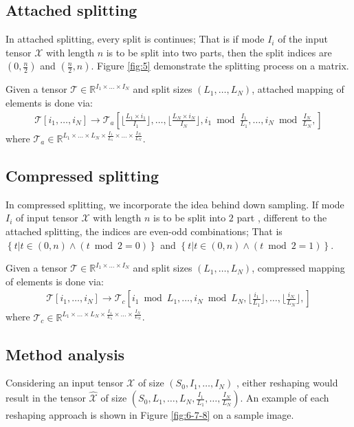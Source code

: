 \documentclass{article}
\begin{document}
\subsection{Attached splitting}
\label{subsec:attached-approach}

In attached splitting, every split is continues; That is if mode  $I_i$ of the input tensor $\mathcal{X}$ with length $n$ is to be split into two parts, then the split indices are $(0,\frac{n}{2})$ and $(\frac{n}{2}, n)$.
Figure 
\ref{fig:5} 
demonstrate the splitting process on a matrix. 

Given a tensor $\mathcal{T} \in \mathbb{R}^{I_1\times\dots\times I_N}$ and split sizes 
$\left(L_1,\dots,L_N\right)$, attached mapping of elements is done via:
\begin{align}
	\label{eq:map1}
	\mathcal{T}\left[i_1,\dots,i_N\right] \longrightarrow
	\mathcal{T}_a\left[
	\lfloor\frac{L_1\times i_1}{I_1}\rfloor,
	\dots,
	\lfloor\frac{L_N\times i_N}{I_N}\rfloor,
	i_1 \bmod{\frac{I_1}{L_1}},
	\dots,
	i_N \bmod{\frac{I_N}{L_N}},
	\right]
\end{align}
where $\mathcal{T}_a \in \mathbb{R}^{L_1\times\dots\times L_N\times \frac{I_1}{L_1}\times\dots\times \frac{I_N}{L_N}}$.
\subsection{Compressed splitting}
\label{subsec:copressed-splitting}

In compressed splitting, we incorporate the idea behind down sampling. If mode $I_i$ of input tensor $\mathcal{X}$ with length $n$ is to be split into $2$ part , different to the attached splitting, the indices are even-odd combinations; That is $\left\{
t | t \in (0,n) \land 
\left(t\bmod{2} = 0\right)
\right\}$
and 
$\left\{
t | t \in (0,n) \land 
\left(t\bmod{2} = 1\right)
\right\}$.

Given a tensor $\mathcal{T} \in \mathbb{R}^{I_1\times\dots\times I_N}$ and split sizes 
$\left(L_1,\dots,L_N\right)$, compressed mapping of elements is done via:
\begin{align}
	\label{eq:map2}
	\mathcal{T}\left[i_1,\dots,i_N\right] \longrightarrow
	\mathcal{T}_c\left[
	i_1 \bmod{L_1},
	\dots,
	i_N \bmod{L_N},
	\lfloor\frac{i_1}{L_1}\rfloor,
	\dots,
	\lfloor\frac{i_N}{L_N}\rfloor,
	\right]
\end{align}
where $\mathcal{T}_c \in \mathbb{R}^{L_1\times\dots\times L_N\times \frac{I_1}{L_1}\times\dots\times \frac{I_N}{L_N}}$.
\subsection{Method analysis}
\label{subsec:method-analysis}
Considering an input tensor $\mathcal{X}$ of size
$(S_0,I_1,\dots,I_N)$
, either reshaping would result in the tensor $\hat{\mathcal{X}}$ of size
$(S_0,L_1,\dots,L_N,\frac{I_1}{L_1}, \dots, \frac{I_N}{L_N})$. An example of each reshaping approach is shown in Figure \ref{fig:6-7-8} on a sample image.
\end{document}
